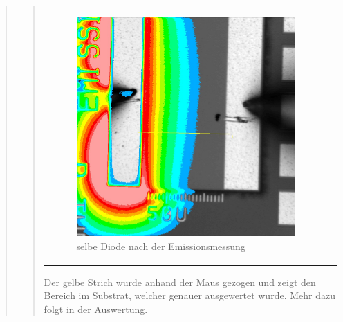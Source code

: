 \begin{quote}
\begin{quote}
\begin{center}
\begin{tabular}{ll}
\begin{minipage}{0.6\textwidth}
                    \end{minipage}
                    \begin{minipage}{0.6\textwidth}
    
                         \begin{figure}[H]
                            \label{fig:}
                            \includegraphics[scale=0.25, trim = 0cm 0cm 0cm
                            0cm,
                            clip]{./Emissionsbilder/eins/nach_Emission_mit_Distanzen.jpg}
                            \caption{selbe Diode nach der Emissionsmessung}
                        \end{figure}
                   \vspace{-1.5em}
    
                    \end{minipage}
    
                \end{tabular}
                \end{center}
                
        \vspace{2em}
        
        Der gelbe Strich wurde anhand der Maus gezogen und zeigt den Bereich im
        Substrat, welcher genauer ausgewertet wurde. Mehr dazu folgt in der
        Auswertung.\\
        

\end{quote}
\end{quote}
